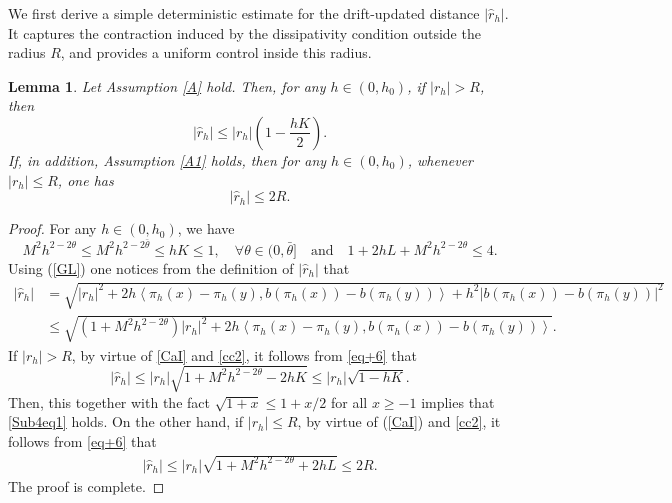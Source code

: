 \documentclass[aap]{imsart}
\theoremstyle{plain}
\newtheorem{lemma}[theorem]{Lemma}
\theoremstyle{definition}
\begin{document}
We first derive a simple deterministic estimate for the drift-updated distance
\(|\hat r_h|\). It captures the contraction induced by the dissipativity condition outside the radius \(R\), and provides a uniform control inside this
radius.

\begin{lemma}\label{Le4.8}
		Let Assumption \ref{A} hold. Then,
		for any \(h\in(0,h_0)\), if \(|r_h|>R\), then
		\begin{equation}\label{Sub4eq1}
			|\hat r_h|\leqslant |r_h|\left(1-\frac{hK}{2}\right).
		\end{equation}
		If, in addition, Assumption \ref{A1} holds, then for any \(h\in(0,h_0)\),
		whenever \(|r_h|\leqslant R\), one has
		\begin{equation}\label{Sub4eq2}
			|\hat r_h|\leqslant 2R.
		\end{equation}
	\end{lemma}
\begin{proof} 
	For any $h\in(0, h_0)$, we have
	\begin{equation}\label{cc2}
		M^2h^{2-2\theta}\leqslant M^2h^{2-2\bar{\theta}}\leqslant hK\leqslant 1,\quad \forall \theta\in(0, \bar{\theta}]\quad \text{and} \quad 1+2hL+M^2h^{2-2\theta}\leqslant 4.
	\end{equation}
	Using  (\ref{GL}) one notices from the definition of $|\hat{r}_h|$ that 
	\begin{equation}\label{eq+6}
		\begin{aligned}
			|\hat{r}_h|
			&=\sqrt{|r_h|^2+\!2h\left\langle\pi_h(x)-\pi_h(y), b(\pi_h(x))-b(\pi_h(y))\right\rangle+h^2|b(\pi_h(x))-b(\pi_h(y))|^2}\\
			&\leqslant \sqrt{(1+M^2h^{2-2\theta})|r_h|^2+\!2h\left\langle\pi_h(x)-\pi_h(y), b(\pi_h(x))-b(\pi_h(y))\right\rangle }.
		\end{aligned}
	\end{equation}
	If $|r_h|>R$, by virtue of \eqref{CaI} and \eqref{cc2}, it follows from \eqref{eq+6} that
	\begin{equation*}
		|\hat{r}_h| \leqslant  |r_h|\sqrt{1+M^2h^{2-2\theta}-2hK}\leqslant |r_h|\sqrt{1-hK}.
	\end{equation*}
	Then, this together with the fact $\sqrt{1+x}\leqslant 1+x/2$ for all $x\geqslant-1$   implies that \eqref{Sub4eq1} holds. On the other hand, if $|r_h|\leqslant R$, by virtue of  (\ref{CaI}) and \eqref{cc2}, it follows from \eqref{eq+6} that
	\begin{equation}\label{ss}
		\begin{aligned}
			|\hat{r}_h|	\leqslant |r_h|\sqrt{1+M^2h^{2-2\theta}+2hL}\leqslant 2R.
		\end{aligned}
	\end{equation}
	The proof is complete.
\end{proof}
\end{document}
